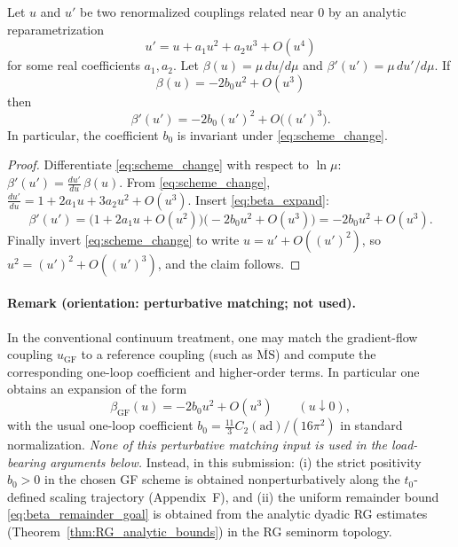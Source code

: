\begin{proposition}
\label{prop:b0_scheme_invariant}
Let $u$ and $u'$ be two renormalized couplings related near $0$ by an analytic reparametrization
\begin{equation}
\label{eq:scheme_change}
 u' = u + a_1 u^2 + a_2 u^3 + O(u^4)
\end{equation}
for some real coefficients $a_1,a_2$.
Let $\beta(u)=\mu\,du/d\mu$ and $\beta'(u')=\mu\,du'/d\mu$.
If
\begin{equation}
\label{eq:beta_expand}
 \beta(u) = -2 b_0 u^2 + O(u^3)
\end{equation}
then
\begin{equation}
\beta'(u') = -2 b_0 (u')^2 + O\bigl((u')^3\bigr).
\end{equation}
In particular, the coefficient $b_0$ is invariant under \eqref{eq:scheme_change}.
\end{proposition}

\begin{proof}
Differentiate \eqref{eq:scheme_change} with respect to $\ln\mu$:
$\beta'(u') = \frac{d u'}{d u}\,\beta(u)$.
From \eqref{eq:scheme_change},
$\frac{d u'}{d u}=1+2a_1u+3a_2u^2+O(u^3)$.
Insert \eqref{eq:beta_expand}:
\[
\beta'(u')=\bigl(1+2a_1u+O(u^2)\bigr)\bigl(-2 b_0 u^2+O(u^3)\bigr)=-2 b_0 u^2+O(u^3).
\]
Finally invert \eqref{eq:scheme_change} to write $u=u'+O((u')^2)$, so $u^2=(u')^2+O((u')^3)$, and the claim follows.
\end{proof}

\paragraph{Remark (orientation: perturbative matching; not used).}
In the conventional continuum treatment, one may match the gradient-flow coupling $u_{\mathrm{GF}}$ to a reference coupling
(such as $\overline{\mathrm{MS}}$) and compute the corresponding one-loop coefficient and higher-order terms.
In particular one obtains an expansion of the form
\[
\beta_{\mathrm{GF}}(u)=-2b_0u^2+O(u^3)\qquad (u\downarrow 0),
\]
with the usual one-loop coefficient $b_0=\frac{11}{3}C_2(\mathrm{ad})/(16\pi^2)$ in standard normalization.
\emph{None of this perturbative matching input is used in the load-bearing arguments below.}
Instead, in this submission:
(i) the strict positivity $b_0>0$ in the chosen GF scheme is obtained nonperturbatively along the $t_0$-defined scaling trajectory
(Appendix~F), and
(ii) the uniform remainder bound \eqref{eq:beta_remainder_goal} is obtained from the analytic dyadic RG estimates
(Theorem~\ref{thm:RG_analytic_bounds}) in the RG seminorm topology.

